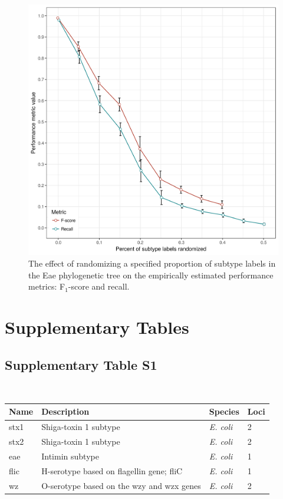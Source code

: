 \documentclass[11pt,letterpaper]{article}
\begin{document}
\begin{figure}[h!]
\centering
\includegraphics[scale=0.5]{sfig02.png}
\caption{The effect of randomizing a specified proportion of subtype labels in the Eae phylogenetic tree on the empirically estimated performance metrics: F$_1$-score and recall.}
\end{figure}

\clearpage

\section{Supplementary Tables}

\subsection{Supplementary Table S1}

~

\begin{minipage}{\linewidth}
\centering
{}
\medskip
\begin{tabular}{@{}llll@{}}\toprule Name &
Description & Species & Loci\\\midrule
stx1 & Shiga-toxin 1 subtype & {\it E. coli} & 2 \\
stx2 & Shiga-toxin 1 subtype & {\it E. coli} & 2\\
eae & Intimin subtype & {\it E. coli} & 1\\
flic & H-serotype based on flagellin gene; fliC & {\it E. coli} & 1\\
wz & O-serotype based on the wzy and wzx genes & {\it E. coli} & 2\\\bottomrule
\end{tabular}\par

\end{minipage}
\end{document}
